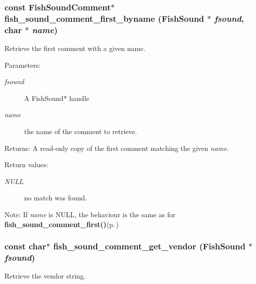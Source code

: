 \subsubsection{\setlength{\rightskip}{0pt plus 5cm}const {\bf Fish\-Sound\-Comment}$\ast$ fish\_\-sound\_\-comment\_\-first\_\-byname ({\bf Fish\-Sound} $\ast$ {\em fsound}, char $\ast$ {\em name})}\label{comments_8h_a3}


Retrieve the first comment with a given name. 

\begin{Desc}
\item[Parameters:]
\begin{description}
\item[{\em fsound}]A Fish\-Sound$\ast$ handle \item[{\em name}]the name of the comment to retrieve. \end{description}
\end{Desc}
\begin{Desc}
\item[Returns:]A read-only copy of the first comment matching the given {\em name\/}. \end{Desc}
\begin{Desc}
\item[Return values:]
\begin{description}
\item[{\em NULL}]no match was found. \end{description}
\end{Desc}
\begin{Desc}
\item[Note:]If {\em name\/} is NULL, the behaviour is the same as for {\bf fish\_\-sound\_\-comment\_\-first()}{\rm (p.\,\pageref{comments_8h_a1})} \end{Desc}
\subsubsection{\setlength{\rightskip}{0pt plus 5cm}const char$\ast$ fish\_\-sound\_\-comment\_\-get\_\-vendor ({\bf Fish\-Sound} $\ast$ {\em fsound})}\label{comments_8h_a0}


Retrieve the vendor string. 

